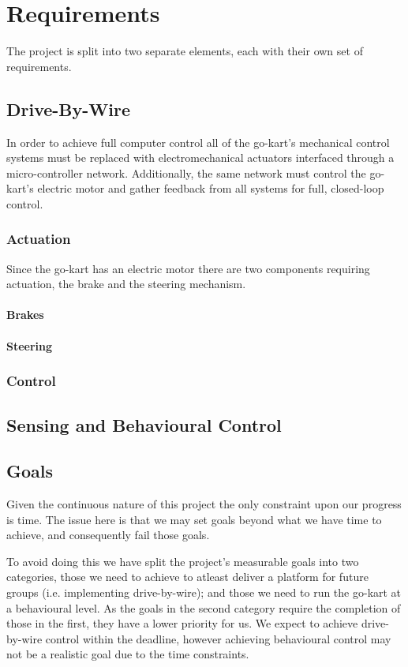 \chapter{Requirements}
The project is split into two separate elements, each with their own set of requirements.
\section{Drive-By-Wire}
In order to achieve full computer control all of the go-kart's mechanical control systems must be replaced with electromechanical actuators interfaced through a micro-controller network. Additionally, the same network must control the go-kart's electric motor and gather feedback from all systems for full, closed-loop control.

\subsection{Actuation}
Since the go-kart has an electric motor there are two components requiring actuation, the brake and the steering mechanism.

\subsubsection{Brakes}

\subsubsection{Steering}

\subsection{Control}

\section{Sensing and Behavioural Control}

\section{Goals}
Given the continuous nature of this project the only constraint upon our progress is time. The issue here is that we may set goals beyond what we have time to achieve, and consequently fail those goals.

To avoid doing this we have split the project's measurable goals into two categories, those we need to achieve to atleast deliver a platform for future groups (i.e. implementing drive-by-wire); and those we need to run the go-kart at a behavioural level. As the goals in the second category require the completion of those in the first, they have a lower priority for us. We expect to achieve drive-by-wire control within the deadline, however achieving behavioural control may not be a realistic goal due to the time constraints.

